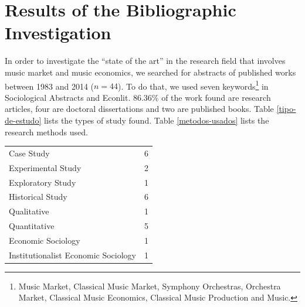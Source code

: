 \documentclass[a4paper, 12pt, openright, oneside, german, french, brazil, english, article]{abntex2}
\begin{document}
	\section[Biliographic Investigation]{Results of the Bibliographic Investigation}
	
		
	
	In order to investigate the ``state of the art'' in the research field that involves music market and music economics, we searched for abstracts of published works between 1983 and 2014 ($n = 44$). To do that, we used seven keywords\footnote{Music Market, Classical Music Market, Symphony Orchestras, Orchestra Market, Classical Music Economics, Classical Music Production and Music.} in Sociological Abstracts and Econlit. 86.36\% of the work found are research articles, four are doctoral dissertations and two are published books. Table \ref{tipo-de-estudo} lists the types of study found. Table \ref{metodos-usados} lists the research methods used.
	
	\begin{table}[ht]
		{\begin{tabular}{lr}
				\hline
				\hline
				Case Study &   6 \\ 
				Experimental Study &   2 \\ 
				Exploratory Study &   1 \\ 
				Historical Study &   6 \\ 
				Qualitative &   1 \\ 
				Quantitative &   5 \\ 
				Economic Sociology &   1 \\ 
				Institutionalist Economic Sociology &   1 \\ 
				\hline
			\end{tabular}
		}
		{}
	\end{table}
	
\end{document}
